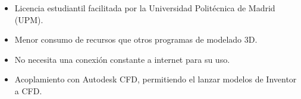 \begin{itemize}
	\item Licencia estudiantil facilitada por la Universidad Politécnica de Madrid (UPM).
	\item Menor consumo de recursos que otros programas de modelado 3D.
	\item No necesita una conexión constante a internet para su uso.
	\item Acoplamiento con Autodesk CFD, permitiendo el lanzar modelos de Inventor a CFD. 
\end{itemize}

